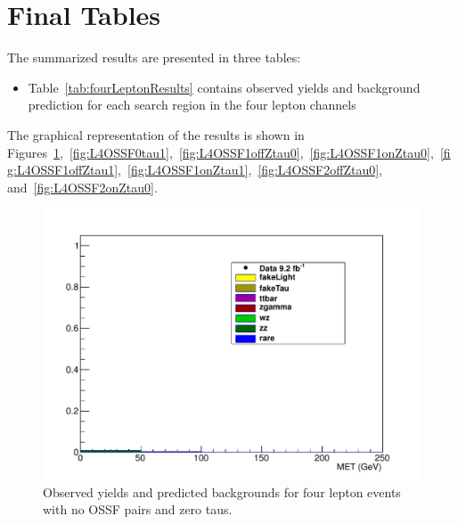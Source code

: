 \section{Final Tables}
The summarized results are presented in three tables: 
\begin{itemize}
\item Table~\ref{tab:fourLeptonResults} contains observed yields  and background prediction 
for each search region in the four lepton channels
\end{itemize}

The graphical representation of the results is shown in Figures~\ref{fig:L4OSSF0tau0},~\ref{fig:L4OSSF0tau1},~\ref{fig:L4OSSF1offZtau0},~\ref{fig:L4OSSF1onZtau0},~\ref{fig:L4OSSF1offZtau1},~\ref{fig:L4OSSF1onZtau1},~\ref{fig:L4OSSF2offZtau0}, and~\ref{fig:L4OSSF2onZtau0}.

\begin{figure}[htp]
\begin{center}
\includegraphics[width=1.0\textwidth]{plots/4L_MET_dist_offZ_ossf0_tau0_note.pdf}
\caption{Observed yields and predicted backgrounds for four lepton events with no OSSF pairs and zero taus.}
\label{fig:L4OSSF0tau0}
\end{center}
\end{figure}

